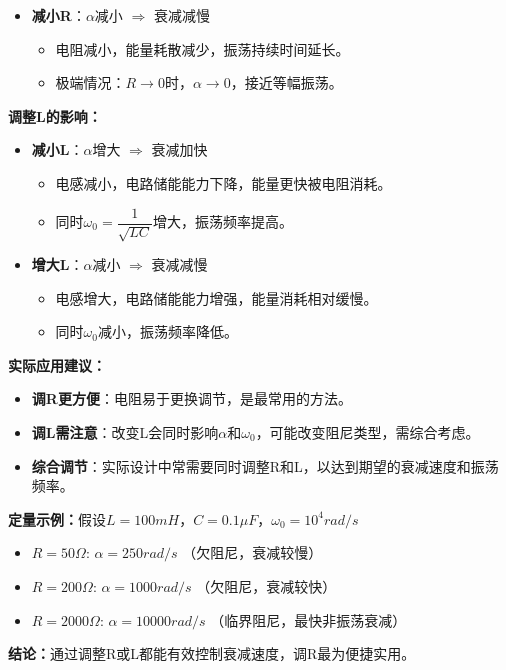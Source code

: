 \documentclass[12pt,a4paper]{article}
\begin{document}
\begin{enumerate}
\begin{itemize}
        \item \textbf{减小R}：$\alpha$减小 $\Rightarrow$ 衰减减慢
        \begin{itemize}
            \item 电阻减小，能量耗散减少，振荡持续时间延长。
            \item 极端情况：$R \to 0$时，$\alpha \to 0$，接近等幅振荡。
        \end{itemize}
    \end{itemize}
    
    \textbf{调整L的影响：}
    \begin{itemize}
        \item \textbf{减小L}：$\alpha$增大 $\Rightarrow$ 衰减加快
        \begin{itemize}
            \item 电感减小，电路储能能力下降，能量更快被电阻消耗。
            \item 同时$\omega_0 = \dfrac{1}{\sqrt{LC}}$增大，振荡频率提高。
        \end{itemize}
        
        \item \textbf{增大L}：$\alpha$减小 $\Rightarrow$ 衰减减慢
        \begin{itemize}
            \item 电感增大，电路储能能力增强，能量消耗相对缓慢。
            \item 同时$\omega_0$减小，振荡频率降低。
        \end{itemize}
    \end{itemize}
    
    \textbf{实际应用建议：}
    \begin{itemize}
        \item \textbf{调R更方便}：电阻易于更换调节，是最常用的方法。
        \item \textbf{调L需注意}：改变L会同时影响$\alpha$和$\omega_0$，可能改变阻尼类型，需综合考虑。
        \item \textbf{综合调节}：实际设计中常需要同时调整R和L，以达到期望的衰减速度和振荡频率。
    \end{itemize}
    
    \textbf{定量示例：}假设$L = 100mH$，$C = 0.1\mu F$，$\omega_0 = 10^4 rad/s$
    \begin{itemize}
        \item $R = 50\Omega$: $\alpha = 250 rad/s$ （欠阻尼，衰减较慢）
        \item $R = 200\Omega$: $\alpha = 1000 rad/s$ （欠阻尼，衰减较快）
        \item $R = 2000\Omega$: $\alpha = 10000 rad/s$ （临界阻尼，最快非振荡衰减）
    \end{itemize}
    
    \textbf{结论：}通过调整R或L都能有效控制衰减速度，调R最为便捷实用。
    
\end{enumerate}
\end{document}
